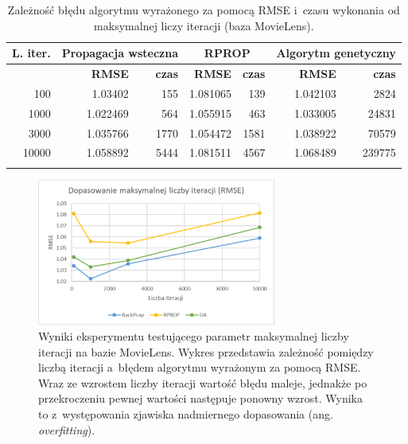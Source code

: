 \documentclass[twoside]{iisthesis}
\begin{document}
				\begin{longtable}[H]{r||rr|rr|rr}		
					\label{tab:expiterations}		
					\textbf{L. iter.} & \multicolumn{2}{c|}{\textbf{Propagacja wsteczna}}  & \multicolumn{2}{c|}{\textbf{RPROP}} & \multicolumn{2}{c}{\textbf{Algorytm genetyczny}}  \\
					\hline
					& \textbf{RMSE} & \textbf{czas} & \textbf{RMSE} & \textbf{czas} & \textbf{RMSE} & \textbf{czas} \\
					\hline
					100 & 1.03402 & 155 & 1.081065 & 139 & 1.042103 & 2824 \\
					1000  & 1.022469 & 564 & 1.055915 & 463 & 1.033005 & 24831  \\
					3000  & 1.035766 & 1770 & 1.054472 & 1581  & 1.038922 & 70579  \\
					10000 & 1.058892  & 5444 & 1.081511  & 4567  & 1.068489 & 239775 \\
					\caption{Zależność błędu algorytmu wyrażonego za pomocą RMSE i~czasu wykonania od maksymalnej liczy iteracji (baza MovieLens).}
				\end{longtable}
				
				\begin{figure}[!ht]
					\centering
					\includegraphics[width=0.7\textwidth]{expiterations_rmse}			
					\caption{Wyniki eksperymentu testującego parametr maksymalnej liczby iteracji na bazie MovieLens. Wykres przedstawia zależność pomiędzy liczbą iteracji a~błędem algorytmu wyrażonym za pomocą RMSE. Wraz ze wzrostem liczby iteracji wartość błędu maleje, jednakże po przekroczeniu pewnej wartości następuje ponowny wzrost. Wynika to z~występowania zjawiska nadmiernego dopasowania (ang. \textit{overfitting}). }
					\label{fig:expiterations_rmse}
				\end{figure}
			
\end{document}
